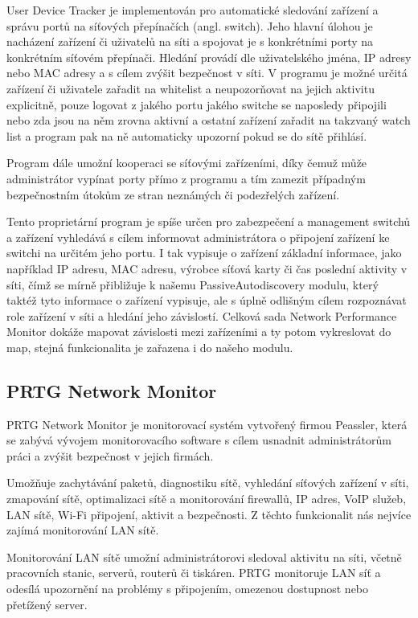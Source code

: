 \documentclass[thesis=B,czech,hidelinks]{FITthesis}[2019/03/21]
\begin{document}
        User Device Tracker \cite{SolarWinds} je implementován pro automatické sledování zařízení a správu portů na síťových přepínačích (angl. switch). Jeho hlavní úlohou je nacházení zařízení či uživatelů na síti a spojovat je s konkrétními porty na konkrétním síťovém přepínači. Hledání provádí dle uživatelského jména, IP adresy nebo MAC adresy a s cílem zvýšit bezpečnost v síti. V programu je možné určitá zařízení či uživatele zařadit na whitelist a neupozorňovat na jejich aktivitu explicitně, pouze logovat z jakého portu jakého switche se naposledy připojili nebo zda jsou na něm zrovna aktivní a ostatní zařízení zařadit na takzvaný watch list a program pak na ně automaticky upozorní pokud se do sítě přihlásí. 
        
        Program dále umožní kooperaci se síťovými zařízeními, díky čemuž může administrátor vypínat porty přímo z programu a tím zamezit případným bezpečnostním útokům ze stran neznámých či podezřelých zařízení. 
        
        Tento proprietární program je spíše určen pro zabezpečení a management switchů a zařízení vyhledává s cílem informovat administrátora o připojení zařízení ke switchi na určitém jeho portu. I tak vypisuje o zařízení základní informace, jako například IP adresu, MAC adresu, výrobce síťová karty či čas poslední aktivity v síti, čímž se mírně přibližuje k našemu PassiveAutodiscovery modulu, který taktéž tyto informace o zařízení vypisuje, ale s úplně odlišným cílem rozpoznávat role zařízení v síti a hledání jeho závislostí. Celková sada Network Performance Monitor dokáže mapovat závislosti mezi zařízeními a ty potom vykreslovat do map, stejná funkcionalita je zařazena i do našeho modulu.
        
        \subsection{PRTG Network Monitor}
        PRTG Network Monitor \cite{PRTG} je monitorovací systém vytvořený firmou Peassler, která se zabývá vývojem monitorovacího software s cílem usnadnit administrátorům práci a zvýšit bezpečnost v jejich firmách.
        
        Umožňuje zachytávání paketů, diagnostiku sítě, vyhledání síťových zařízení v síti, zmapování sítě, optimalizaci sítě a monitorování firewallů, IP adres, VoIP služeb, LAN sítě, Wi-Fi připojení, aktivit a bezpečnosti. Z těchto funkcionalit nás nejvíce zajímá monitorování LAN sítě. 
        
        Monitorování LAN sítě umožní administrátorovi sledoval aktivitu na síti, včetně pracovních stanic, serverů, routerů či tiskáren. PRTG monitoruje LAN síť a odesílá upozornění na problémy s připojením, omezenou dostupnost nebo přetížený server.
        
\end{document}
